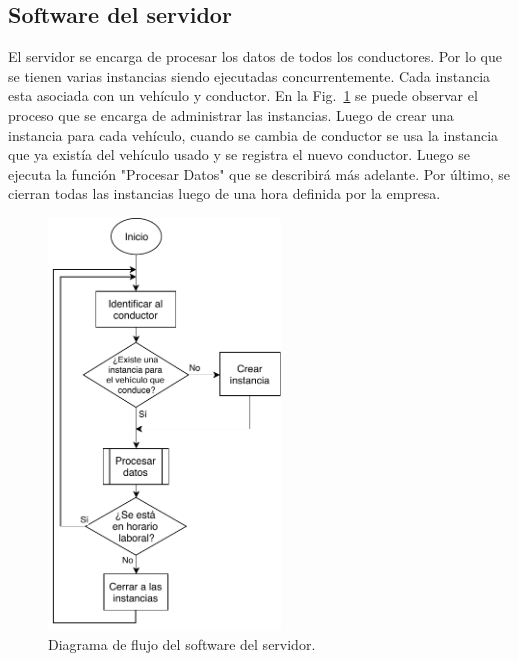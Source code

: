 
\subsection{Software del servidor}

El servidor se encarga de procesar los datos de todos los conductores. Por lo que se tienen varias instancias siendo ejecutadas concurrentemente. Cada instancia esta asociada con un vehículo y conductor. En la Fig.~\ref{fig:Flujo_servidor_principal} se puede observar el proceso que se encarga de administrar las instancias. Luego de crear una instancia para cada vehículo, cuando se cambia de conductor se usa la instancia que ya existía del vehículo usado y se registra el nuevo conductor. Luego se ejecuta la función "Procesar Datos" que se describirá más adelante. Por último, se cierran todas las instancias luego de una hora definida por la empresa.

\begin{figure}[bth!]
\centering
\includegraphics[width=0.55\textwidth]{Flujo_servidor_principal.pdf}
\caption{Diagrama de flujo del software del servidor.}
\label{fig:Flujo_servidor_principal}
\end{figure}

